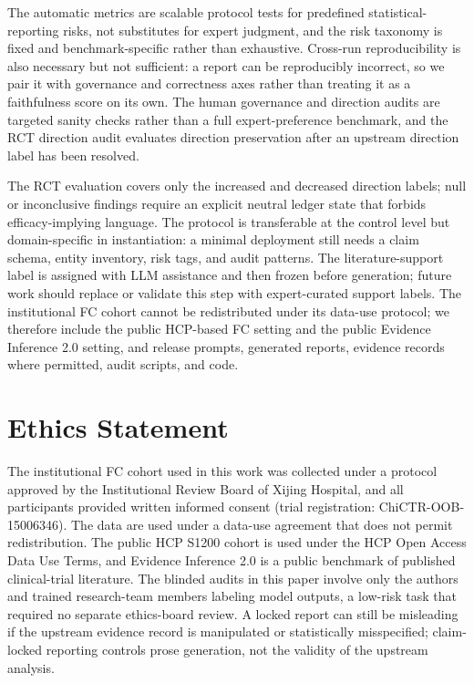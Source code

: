 \documentclass[10pt,twocolumn]{article}
\begin{document}
The automatic metrics are scalable protocol tests for predefined statistical-reporting risks, not substitutes for expert judgment, and the risk taxonomy is fixed and benchmark-specific rather than exhaustive. Cross-run reproducibility is also necessary but not sufficient: a report can be reproducibly incorrect, so we pair it with governance and correctness axes rather than treating it as a faithfulness score on its own. The human governance and direction audits are targeted sanity checks rather than a full expert-preference benchmark, and the RCT direction audit evaluates direction preservation after an upstream direction label has been resolved.

The RCT evaluation covers only the increased and decreased direction labels; null or inconclusive findings require an explicit neutral ledger state that forbids efficacy-implying language. The protocol is transferable at the control level but domain-specific in instantiation: a minimal deployment still needs a claim schema, entity inventory, risk tags, and audit patterns. The literature-support label is assigned with LLM assistance and then frozen before generation; future work should replace or validate this step with expert-curated support labels. The institutional FC cohort cannot be redistributed under its data-use protocol; we therefore include the public HCP-based FC setting and the public Evidence Inference 2.0 setting, and release prompts, generated reports, evidence records where permitted, audit scripts, and code.

\section*{Ethics Statement} The institutional FC cohort used in this work was collected under a protocol approved by the Institutional Review Board of Xijing Hospital, and all participants provided written informed consent (trial registration: ChiCTR-OOB-15006346). The data are used under a data-use agreement that does not permit redistribution. The public HCP S1200 cohort is used under the HCP Open Access Data Use Terms, and Evidence Inference 2.0 is a public benchmark of published clinical-trial literature. The blinded audits in this paper involve only the authors and trained research-team members labeling model outputs, a low-risk task that required no separate ethics-board review. A locked report can still be misleading if the upstream evidence record is manipulated or statistically misspecified; claim-locked reporting controls prose generation, not the validity of the upstream analysis.
\end{document}
